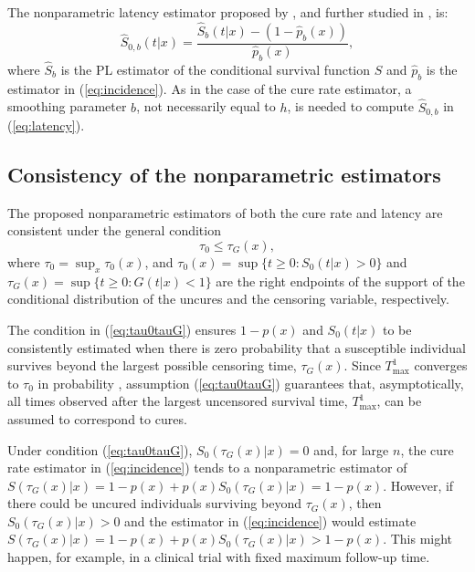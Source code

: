 The nonparametric latency estimator proposed by \cite{Lopez1}, and further studied in \cite{Lopez2}, is:
\begin{equation}
   \hat S_{0,b} \left (t|x \right) = \frac{\hat S_{b} \left (t|x \right) - \left(1 - \hat{p}_{b}(x) \right)}{ \hat{p}_{b}\left (x \right)},
   \label{eq:latency}
\end{equation}
where $\hat S_{b}$ is the PL estimator of the conditional survival function $S$ \citep{Beran} and $\hat{p}_{b}$ is the estimator in (\ref{eq:incidence}). As in the case of the cure rate estimator, a smoothing parameter $b$, not necessarily equal to $h$, is needed to compute $\hat S_{0,b}$ in (\ref{eq:latency}).

\subsection{Consistency of the nonparametric estimators} 
\label{sec:existence_of_cure}

The proposed nonparametric estimators of both the cure rate and latency are consistent under the general condition \citep[see][]{Laska, Maller1, Lopez1, Lopez2}
\begin{equation} \label{eq:tau0tauG}
  \tau_0 \leq \tau_G (x),
\end{equation}
where $\tau_0=\sup_x \tau_0(x)$, and $\tau_0(x) = \sup\{ t\geq 0 : S_0\left (t|x \right) > 0 \}$ and $\tau_G(x) = \sup\{ t\geq 0 : G \left(t|x \right) < 1 \}$ are the right endpoints of the support of the conditional distribution of the uncures and the censoring variable, respectively.

The condition in (\ref{eq:tau0tauG}) ensures $1-p\left(x \right)$ and $S_0\left (t|x \right)$ to be consistently estimated when there is zero probability that a susceptible individual survives beyond the largest possible censoring time, $\tau_G \left(x \right)$. Since $T^1_{\max}$ converges to $\tau_0$ in probability \citep[see][]{Xu}, assumption (\ref{eq:tau0tauG}) guarantees that, asymptotically, all times observed after the largest uncensored survival time, $T^1_{\max}$, can be assumed to correspond to cures.

Under condition (\ref{eq:tau0tauG}), $S_0 \left (\tau_{G}(x) |x \right)=0$ and, for large $n$, the cure rate estimator in (\ref{eq:incidence}) tends to a nonparametric estimator of $S \left (\tau_G \left(x \right)|x \right) = 1-p(x) + p(x) S_0\left(\tau_G(x)|x \right) = 1-p(x)$. However, if there could be uncured individuals surviving beyond $\tau_G(x)$, then $S_0\left(\tau_G(x) |x \right) > 0$ and the estimator in (\ref{eq:incidence}) would estimate $S\left(\tau_G(x)|x \right) = 1-p(x) + p(x) S_0\left(\tau_G(x)|x \right) > 1-p(x)$. This might happen, for example, in a clinical trial with fixed maximum follow-up time.

